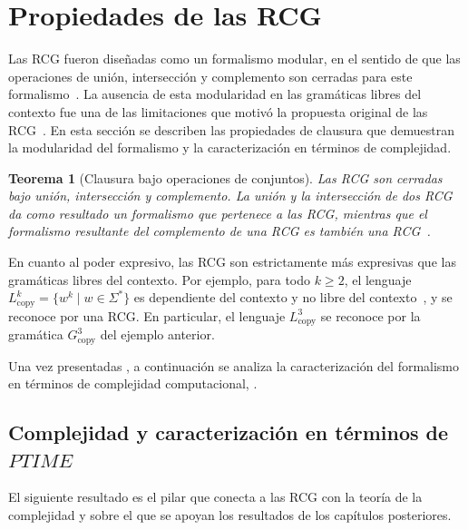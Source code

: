 \documentclass{report}
\theoremstyle{definition}
\theoremstyle{plain}
\newtheorem{teorema}{Teorema}[chapter]
\theoremstyle{remark}
\begin{document}
\section{Propiedades de las RCG}
\label{sec:propiedades-rcg}

Las RCG fueron diseñadas como un formalismo modular, en el sentido de
que las operaciones de unión, intersección y complemento son cerradas
para este formalismo~\cite{boullier1998proposal}. La ausencia de esta
modularidad en las gramáticas libres del contexto fue una de las
limitaciones que motivó la propuesta original de las
RCG~\cite{boullier1998proposal}. En esta sección se describen las
propiedades de clausura que demuestran la modularidad del formalismo y
la caracterización en términos de complejidad.

\begin{teorema}[Clausura bajo operaciones de conjuntos]
Las RCG son cerradas bajo unión, intersección y complemento. La unión
y la intersección de dos RCG da como resultado un formalismo que
pertenece a las RCG, mientras que el formalismo resultante del
complemento de una RCG es también una RCG~.
\end{teorema}

En cuanto al poder expresivo, las RCG son estrictamente más expresivas
que las gramáticas libres del contexto. Por ejemplo, para todo
$k \ge 2$, el lenguaje $L_{\mathrm{copy}}^k = \{ w^k \mid w \in \Sigma^*\}$
es dependiente del contexto y no libre del
contexto~\cite{hopcroft2006introduction}, y se reconoce por una RCG. En
particular, el lenguaje $L_{\mathrm{copy}}^3$ se reconoce por la
gramática $G_{\mathrm{copy}}^3$ del ejemplo anterior.

Una vez presentadas , a continuación se
analiza la caracterización del formalismo en términos de complejidad
computacional, .

\subsection{Complejidad y caracterización en términos de $PTIME$}

El siguiente resultado es el pilar que conecta a las RCG con la teoría
de la complejidad y sobre el que se apoyan los resultados de los
capítulos posteriores.
\end{document}
